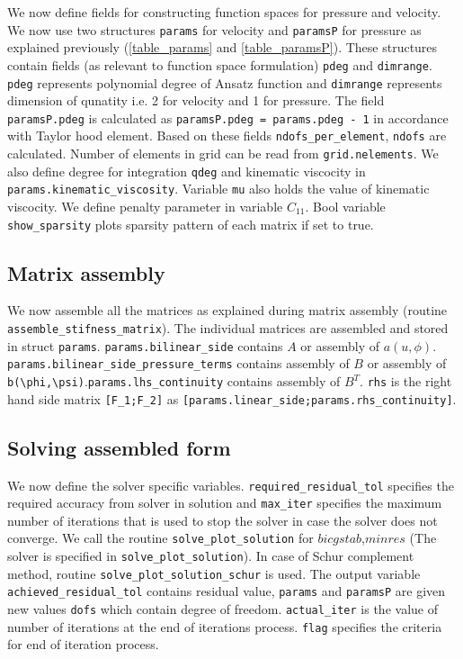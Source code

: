 \documentclass[a4paper]{book}
\begin{document}
We now define fields for constructing function spaces for pressure and velocity. We now use two structures \verb|params| for velocity and \verb|paramsP| for pressure as explained previously (\ref{table_params} and \ref{table_paramsP}). These structures contain fields (as relevant to function space formulation) \verb|pdeg| and \verb|dimrange|. \verb|pdeg| represents polynomial degree of Ansatz function and \verb|dimrange| represents  dimension of qunatity i.e. 2 for velocity and 1 for pressure. The field \verb|paramsP.pdeg| is calculated as \verb|paramsP.pdeg = params.pdeg - 1| in accordance with Taylor hood element. Based on these fields \verb|ndofs_per_element|, \verb|ndofs| are calculated. Number of elements in grid can be read from \verb|grid.nelements|. We also define degree for integration \verb|qdeg| and kinematic viscocity in \linebreak \verb|params.kinematic_viscosity|. Variable \verb|mu| also holds the value of kinematic viscocity. We define penalty parameter in variable $C_{11}$. Bool variable \verb|show_sparsity| plots sparsity pattern of each matrix if set to true.\\

\subsection{Matrix assembly}

We now assemble all the matrices as explained during matrix assembly (routine \verb|assemble_stifness_matrix|). The individual matrices are assembled and stored in struct \verb|params|. \verb|params.bilinear_side| contains $A$ or assembly of $a(u,\phi)$. \verb|params.bilinear_side_pressure_terms| contains assembly of $B$ or assembly of \verb|b(\phi,\psi)|.\verb|params.lhs_continuity| contains assembly of $B^T$. \verb|rhs| is the right hand side matrix \verb|[F_1;F_2]| as \linebreak \verb|[params.linear_side;params.rhs_continuity]|. \\

\subsection{Solving assembled form}

We now define the solver specific variables. \verb|required_residual_tol| specifies the required accuracy from solver in solution and \verb|max_iter| specifies the maximum number of iterations that is used to stop the solver in case the solver does not converge. We call the routine \verb|solve_plot_solution| for $bicgstab$,$minres$ (The solver is specified in \verb|solve_plot_solution|). In case of Schur complement method, routine \verb|solve_plot_solution_schur| is used. The output variable \verb|achieved_residual_tol| contains residual value, \verb|params| and \verb|paramsP| are given new values \verb|dofs| which contain degree of freedom. \verb|actual_iter| is the value of number of iterations at the end of iterations process. \verb|flag| specifies the criteria for end of iteration process.\\
\end{document}
